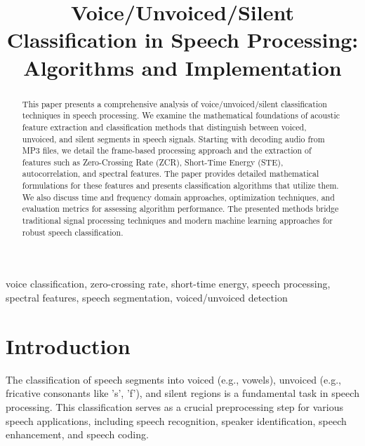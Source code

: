 \documentclass[10pt,journal,compsoc]{IEEEtran}
\begin{document}
\title{Voice/Unvoiced/Silent Classification in Speech Processing: Algorithms and Implementation}

\author{
}

\maketitle

\begin{abstract}
This paper presents a comprehensive analysis of voice/unvoiced/silent classification techniques in speech processing. We examine the mathematical foundations of acoustic feature extraction and classification methods that distinguish between voiced, unvoiced, and silent segments in speech signals. Starting with decoding audio from MP3 files, we detail the frame-based processing approach and the extraction of features such as Zero-Crossing Rate (ZCR), Short-Time Energy (STE), autocorrelation, and spectral features. The paper provides detailed mathematical formulations for these features and presents classification algorithms that utilize them. We also discuss time and frequency domain approaches, optimization techniques, and evaluation metrics for assessing algorithm performance. The presented methods bridge traditional signal processing techniques and modern machine learning approaches for robust speech classification.
\end{abstract}

\begin{IEEEkeywords}
voice classification, zero-crossing rate, short-time energy, speech processing, spectral features, speech segmentation, voiced/unvoiced detection
\end{IEEEkeywords}

\section{Introduction}
The classification of speech segments into voiced (e.g., vowels), unvoiced (e.g., fricative consonants like 's', 'f'), and silent regions is a fundamental task in speech processing. This classification serves as a crucial preprocessing step for various speech applications, including speech recognition, speaker identification, speech enhancement, and speech coding.
\end{document}
